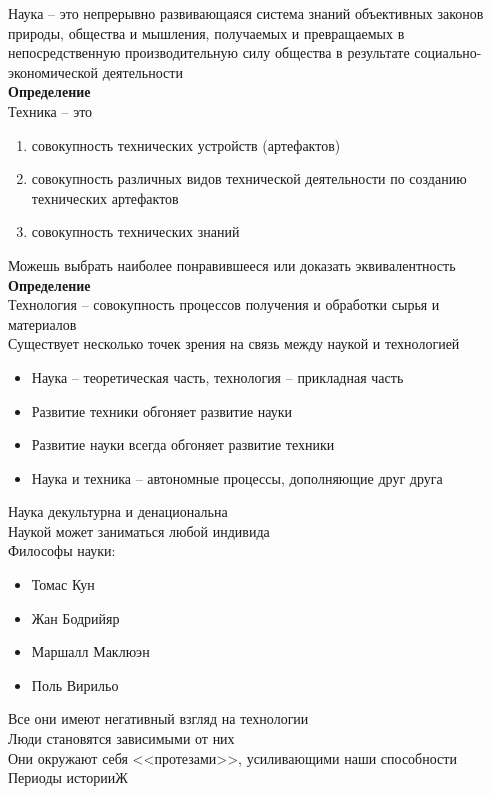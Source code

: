 \documentclass[12pt]{article}
\begin{document}
Наука -- это непрерывно развивающаяся система знаний объективных законов природы, общества и мышления, получаемых и превращаемых в непосредственную производительную силу общества в результате социально-экономической деятельности\\
\textbf{Определение}\\
Техника -- это
\begin{enumerate}
    \item совокупность технических устройств (артефактов)
    \item совокупность различных видов технической деятельности по созданию технических артефактов
    \item совокупность технических знаний
\end{enumerate}
Можешь выбрать наиболее понравившееся или доказать эквивалентность\\
\textbf{Определение}\\
Технология -- совокупность процессов получения и обработки сырья и материалов\\
Существует несколько точек зрения на связь между наукой и технологией\\
\begin{itemize}
    \item Наука -- теоретическая часть, технология -- прикладная часть
    \item Развитие техники обгоняет развитие науки
    \item Развитие науки всегда обгоняет развитие техники
    \item Наука и техника -- автономные процессы, дополняющие друг друга
\end{itemize}
Наука декультурна и денациональна\\
Наукой может заниматься любой индивида\\
Философы науки:
\begin{itemize}
    \item Томас Кун 
    \item Жан Бодрийяр
    \item Маршалл Маклюэн
    \item Поль Вирильо
\end{itemize}
Все они имеют негативный взгляд на технологии\\
Люди становятся зависимыми от них\\
Они окружают себя <<протезами>>, усиливающими наши способности\\
Периоды историиЖ
\end{document}
